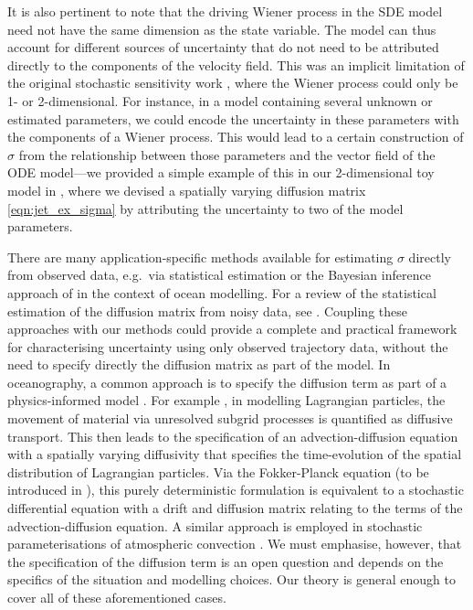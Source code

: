 It is also pertinent to note that the driving Wiener process in the SDE model need not have the same dimension as the state variable.
The model can thus account for different sources of uncertainty that do not need to be attributed directly to the components of the velocity field.
This was an implicit limitation of the original stochastic sensitivity work \citep{Balasuriya_2020_StochasticSensitivityComputable}, where the Wiener process could only be 1- or 2-dimensional.
For instance, in a model containing several unknown or estimated parameters, we could encode the uncertainty in these parameters with the components of a Wiener process.
This would lead to a certain construction of \(\sigma\) from the relationship between those parameters and the vector field of the ODE model---we provided a simple example of this in our 2-dimensional toy model in , where we devised a spatially varying diffusion matrix \cref{eqn:jet_ex_sigma} by attributing the uncertainty to two of the model parameters.

There are many application-specific methods available for estimating \(\sigma\) directly from observed data, e.g.\ via statistical estimation \citep{CotterPavliotis_2009_EstimatingEddyDiffusivities} or the Bayesian inference approach of \citet{YingEtAl_2019_BayesianInferenceOcean} in the context of ocean modelling.
For a review of the statistical estimation of the diffusion matrix from noisy data, see \citet{NielsenEtAl_2000_ParameterEstimationStochastic}.
Coupling these approaches with our methods could provide a complete and practical framework for characterising uncertainty using only observed trajectory data, without the need to specify directly the diffusion matrix as part of the model.
In oceanography, a common approach is to specify the diffusion term as part of a physics-informed model \citep{BerloffMcWilliams_2002_MaterialTransportOceanic}.
For example \citep{vanSebilleEtAl_2018_LagrangianOceanAnalysis,LiEtAl_2023_StochasticDataDrivenParameterization}, in modelling Lagrangian particles, the movement of material via unresolved subgrid processes is quantified as diffusive transport.
This then leads to the specification of an advection-diffusion equation with a spatially varying diffusivity that specifies the time-evolution of the spatial distribution of Lagrangian particles.
Via the Fokker-Planck equation (to be introduced in ), this purely deterministic formulation is equivalent to a stochastic differential equation with a drift and diffusion matrix relating to the terms of the advection-diffusion equation.
A similar approach is employed in stochastic parameterisations of atmospheric convection \citep{WilsonSawford_1996_ReviewLagrangianStochastic}.
We must emphasise, however, that the specification of the diffusion term is an open question and depends on the specifics of the situation and modelling choices.
Our theory is general enough to cover all of these aforementioned cases.

